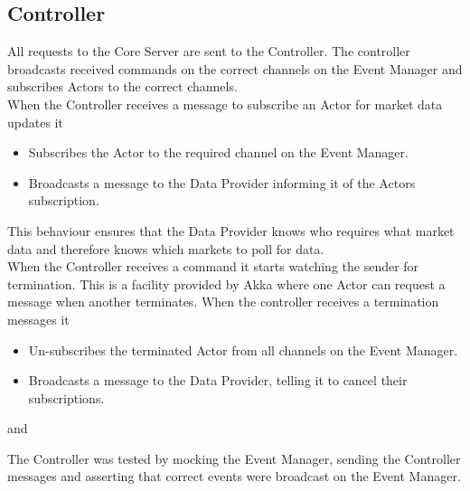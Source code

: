 	\subsection{Controller}
	All requests to the Core Server are sent to the Controller. The controller broadcasts received commands on the correct channels on the Event Manager and subscribes Actors to the correct channels.\\
	
	When the Controller receives a message to subscribe an Actor for market data updates it 
		\begin{itemize}
			\item Subscribes the Actor to the required channel on the Event Manager.
			\item Broadcasts a message to the Data Provider informing it of the Actors subscription.
		\end{itemize}			

	This behaviour ensures that the Data Provider knows who requires what market data and therefore knows which markets to poll for data.\\
	
	When the Controller receives a command it starts watching the sender for termination. This is a facility provided by Akka where one Actor can request a message when another terminates. When the controller receives a termination messages it
		\begin{itemize}
			\item Un-subscribes the terminated Actor from all channels on the Event Manager.
			\item Broadcasts a message to the Data Provider, telling it to cancel their subscriptions.
		\end{itemize}			
	
	 and  
		
	The Controller was tested by mocking the Event Manager, sending the Controller messages and asserting that correct events were broadcast on the Event Manager.
	
